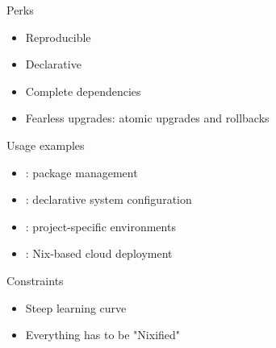 \documentclass[aspectratio=169]{beamer}
\newcommand{\couleur}[2]{{\color{#1}{#2}}}
\begin{document}

\begin{frame}{Perks}
    \begin{exampleblock}{}
        \begin{itemize}
            \item Reproducible
            \item Declarative
            \item Complete dependencies
            \item Fearless upgrades: atomic upgrades and rollbacks
        \end{itemize}
    \end{exampleblock}
\end{frame}

\begin{frame}{Usage examples}
    \begin{itemize}
        \item \couleur{blue-portage}{Nix}: package management
        \item \couleur{blue-portage}{NixOS}: declarative system configuration
        \item \couleur{blue-portage}{Nix shell}: project-specific environments
        \item \couleur{blue-portage}{NixOps}: Nix-based cloud deployment
    \end{itemize}
\end{frame}

\begin{frame}{Constraints}
    \begin{alertblock}{}
        \begin{itemize}
            \item Steep learning curve
            \item Everything has to be "Nixified"
        \end{itemize}
    \end{alertblock}
\end{frame}
\end{document}
